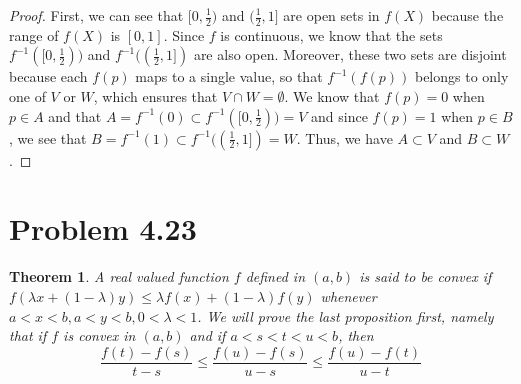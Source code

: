 \documentclass[psamsfonts]{amsart}
\newtheorem{thm}{Theorem}[section]
\theoremstyle{definition}
\theoremstyle{remark}
\numberwithin{equation}{section}
\begin{document}
\begin{proof}
First, we can see that $[0, \frac{1}{2})$ and $(\frac{1}{2}, 1]$ are open sets in $f(X)$ because the range of $f(X)$ is $[0,1]$. Since $f$ is continuous, we know that the sets $f^{-1}([0, \frac{1}{2}))$ and $f^{-1}((\frac{1}{2},1])$ are also open. Moreover, these two sets are disjoint because each $f(p)$ maps to a single value, so that $f^{-1}(f(p))$ belongs to only one of $V$ or $W$, which ensures that $V \cap W = \emptyset$. We know that $f(p) = 0$ when $p \in A$ and that $A = f^{-1}(0) \subset  f^{-1}([0, \frac{1}{2})) = V$ and since $f(p) = 1$ when $p \in B$, we see that $B = f^{-1}(1) \subset f^{-1}((\frac{1}{2},1]) = W$. Thus, we have $A \subset V$ and $B \subset W$. 
\end{proof}

\section{Problem 4.23}

\begin{thm}
A real valued function $f$ defined in $(a,b)$ is said to be convex if $f(\lambda x + ( 1 - \lambda) y) \leq \lambda f(x) + (1 - \lambda) f(y)$ whenever $a<x <b, a<y<b, 0 < \lambda < 1$. We will prove the last proposition first, namely that if $f$ is convex in $(a,b)$ and if $a<s<t<u<b$, then 
\begin{equation}
\frac{f(t) - f(s)}{t-s} \leq \frac{f(u) - f(s)}{u-s} \leq \frac{f(u) - f(t)}{u -t}
\end{equation}
\end{thm}
\end{document}
